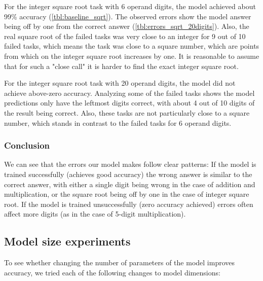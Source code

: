For the integer square root task with 6 operand digits, the model achieved about 99\% accuracy (\cref{tbl:baseline_sqrt}). The observed errors show the model answer being off by one from the correct answer (\cref{tbl:errors_sqrt_20digits}). Also, the real square root of the failed tasks was very close to an integer for 9 out of 10 failed tasks, which means the task was close to a square number, which are points from which on the integer square root increases by one. It is reasonable to assume that for such a "close call" it is harder to find the exact integer square root.

For the integer square root task with 20 operand digits, the model did not achieve above-zero accuracy. Analyzing some of the failed tasks shows the model predictions only have the leftmost digits correct, with about 4 out of 10 digits of the result being correct. Also, these tasks are not particularly close to a square number, which stands in contrast to the failed tasks for 6 operand digits.

\subsubsection{Conclusion}

We can see that the errors our model makes follow clear patterns: If the model is trained successfully (achieves good accuracy) the wrong answer is similar to the correct answer, with either a single digit being wrong in the case of addition and multiplication, or the square root being off by one in the case of integer square root. If the model is trained unsuccessfully (zero accuracy achieved) errors often affect more digits (as in the case of 5-digit multiplication).


\subsection{Model size experiments}
\label{model_size_experiments}

To see whether changing the number of parameters of the model improves accuracy, we tried each of the following changes to model dimensions:

